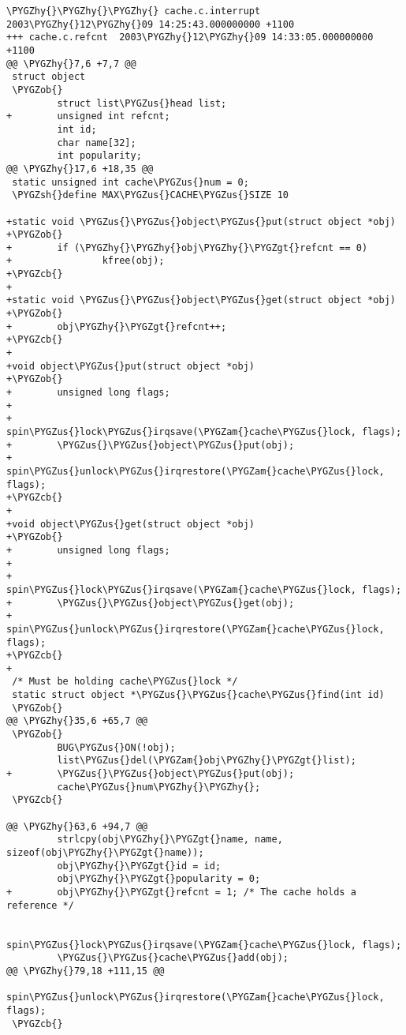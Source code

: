 \documentclass[a4paper,8pt,english]{sphinxmanual}
\def\PYGZus{\char`\_}
\def\PYGZob{\char`\{}
\def\PYGZcb{\char`\}}
\def\PYGZam{\char`\&}
\def\PYGZgt{\char`\>}
\def\PYGZsh{\char`\#}
\def\PYGZhy{\char`\-}
\begin{document}
\begin{Verbatim}[commandchars=\\\{\}]
\PYGZhy{}\PYGZhy{}\PYGZhy{} cache.c.interrupt   2003\PYGZhy{}12\PYGZhy{}09 14:25:43.000000000 +1100
+++ cache.c.refcnt  2003\PYGZhy{}12\PYGZhy{}09 14:33:05.000000000 +1100
@@ \PYGZhy{}7,6 +7,7 @@
 struct object
 \PYGZob{}
         struct list\PYGZus{}head list;
+        unsigned int refcnt;
         int id;
         char name[32];
         int popularity;
@@ \PYGZhy{}17,6 +18,35 @@
 static unsigned int cache\PYGZus{}num = 0;
 \PYGZsh{}define MAX\PYGZus{}CACHE\PYGZus{}SIZE 10

+static void \PYGZus{}\PYGZus{}object\PYGZus{}put(struct object *obj)
+\PYGZob{}
+        if (\PYGZhy{}\PYGZhy{}obj\PYGZhy{}\PYGZgt{}refcnt == 0)
+                kfree(obj);
+\PYGZcb{}
+
+static void \PYGZus{}\PYGZus{}object\PYGZus{}get(struct object *obj)
+\PYGZob{}
+        obj\PYGZhy{}\PYGZgt{}refcnt++;
+\PYGZcb{}
+
+void object\PYGZus{}put(struct object *obj)
+\PYGZob{}
+        unsigned long flags;
+
+        spin\PYGZus{}lock\PYGZus{}irqsave(\PYGZam{}cache\PYGZus{}lock, flags);
+        \PYGZus{}\PYGZus{}object\PYGZus{}put(obj);
+        spin\PYGZus{}unlock\PYGZus{}irqrestore(\PYGZam{}cache\PYGZus{}lock, flags);
+\PYGZcb{}
+
+void object\PYGZus{}get(struct object *obj)
+\PYGZob{}
+        unsigned long flags;
+
+        spin\PYGZus{}lock\PYGZus{}irqsave(\PYGZam{}cache\PYGZus{}lock, flags);
+        \PYGZus{}\PYGZus{}object\PYGZus{}get(obj);
+        spin\PYGZus{}unlock\PYGZus{}irqrestore(\PYGZam{}cache\PYGZus{}lock, flags);
+\PYGZcb{}
+
 /* Must be holding cache\PYGZus{}lock */
 static struct object *\PYGZus{}\PYGZus{}cache\PYGZus{}find(int id)
 \PYGZob{}
@@ \PYGZhy{}35,6 +65,7 @@
 \PYGZob{}
         BUG\PYGZus{}ON(!obj);
         list\PYGZus{}del(\PYGZam{}obj\PYGZhy{}\PYGZgt{}list);
+        \PYGZus{}\PYGZus{}object\PYGZus{}put(obj);
         cache\PYGZus{}num\PYGZhy{}\PYGZhy{};
 \PYGZcb{}

@@ \PYGZhy{}63,6 +94,7 @@
         strlcpy(obj\PYGZhy{}\PYGZgt{}name, name, sizeof(obj\PYGZhy{}\PYGZgt{}name));
         obj\PYGZhy{}\PYGZgt{}id = id;
         obj\PYGZhy{}\PYGZgt{}popularity = 0;
+        obj\PYGZhy{}\PYGZgt{}refcnt = 1; /* The cache holds a reference */

         spin\PYGZus{}lock\PYGZus{}irqsave(\PYGZam{}cache\PYGZus{}lock, flags);
         \PYGZus{}\PYGZus{}cache\PYGZus{}add(obj);
@@ \PYGZhy{}79,18 +111,15 @@
         spin\PYGZus{}unlock\PYGZus{}irqrestore(\PYGZam{}cache\PYGZus{}lock, flags);
 \PYGZcb{}


\end{Verbatim}
\end{document}
